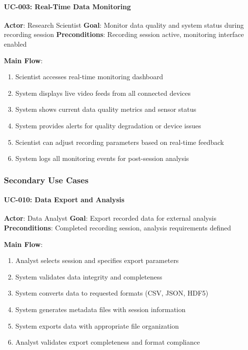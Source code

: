 \documentclass[12pt,a4paper]{report}
\begin{document}
\paragraph{UC-003: Real-Time Data Monitoring}

\textbf{Actor}: Research Scientist  
\textbf{Goal}: Monitor data quality and system status during recording session  
\textbf{Preconditions}: Recording session active, monitoring interface enabled

\textbf{Main Flow}:

\begin{enumerate}
\item Scientist accesses real-time monitoring dashboard
\item System displays live video feeds from all connected devices
\item System shows current data quality metrics and sensor status
\item System provides alerts for quality degradation or device issues
\item Scientist can adjust recording parameters based on real-time feedback
\item System logs all monitoring events for post-session analysis

\end{enumerate}
\subsubsection{Secondary Use Cases}

\paragraph{UC-010: Data Export and Analysis}

\textbf{Actor}: Data Analyst  
\textbf{Goal}: Export recorded data for external analysis  
\textbf{Preconditions}: Completed recording session, analysis requirements defined

\textbf{Main Flow}:

\begin{enumerate}
\item Analyst selects session and specifies export parameters
\item System validates data integrity and completeness
\item System converts data to requested formats (CSV, JSON, HDF5)
\item System generates metadata files with session information
\item System exports data with appropriate file organization
\item Analyst validates export completeness and format compliance

\end{enumerate}
\end{document}
